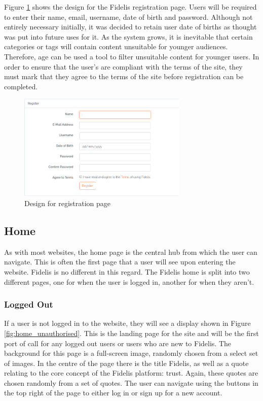 Figure \ref{fig:register-page} shows the design for the Fidelis registration page. Users will be required to enter their name, email, username, date of birth and password. Although not entirely necessary initially, it was decided to retain user date of births as thought was put into future uses for it. As the system grows, it is inevitable that certain categories or tags will contain content unsuitable for younger audiences. Therefore, age can be used a tool to filter unsuitable content for younger users. In order to ensure that the user's are compliant with the terms of the site, they must mark that they agree to the terms of the site before registration can be completed.

\begin{figure}[H]
\centering
\includegraphics[height=2in]{Images/Design/register-page}
\caption{Design for registration page}
\label{fig:register-page}
\end{figure}

\subsection{Home}
As with most websites, the home page is the central hub from which the user can navigate. This is often the first page that a user will see upon entering the website. Fidelis is no different in this regard. The Fidelis home is split into two different pages, one for when the user is logged in, another for when they aren't.

\subsubsection{Logged Out}
If a user is not logged in to the website, they will see a display shown in Figure \ref{fig:home_unauthorised}. This is the landing page for the site and will be the first port of call for any logged out users or users who are new to Fidelis. The background for this page is a full-screen image, randomly chosen from a select set of images. In the centre of the page there is the title Fidelis, as well as a quote relating to the core concept of the Fidelis platform: trust. Again, these quotes are chosen randomly from a set of quotes. The user can navigate using the buttons in the top right of the page to either log in or sign up for a new account.

